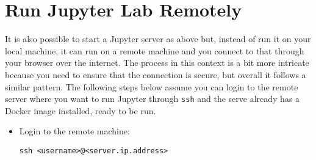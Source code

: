 \documentclass[
]{book}
\begin{document}
\hypertarget{run-jupyter-lab-remotely}{%
\section{Run Jupyter Lab Remotely}\label{run-jupyter-lab-remotely}}

It is also possible to start a Jupyter server as above but, instead of run it
on your local machine, it can run on a remote machine and you connect to that
through your browser over the internet. The process in this context is a bit
more intricate because you need to ensure that the connection is secure, but
overall it follows a similar pattern. The following steps below assume you can
login to the remote server where you want to run Jupyter through \texttt{ssh} and the
serve already has a Docker image installed, ready to be run.

\begin{itemize}
\item
  Login to the remote machine:

\begin{verbatim}
ssh <username>@<server.ip.address>
\end{verbatim}
\end{itemize}
\end{document}
